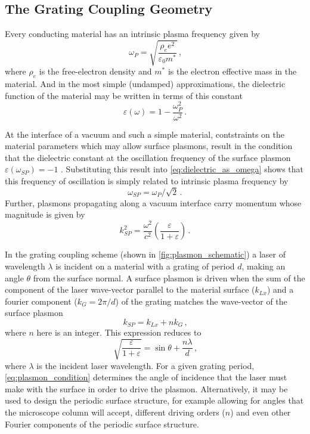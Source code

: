 \subsection{The Grating Coupling Geometry}

Every conducting material has an intrinsic plasma frequency given by 
\begin{equation}
  \omega_{P} = \sqrt{\frac{\rho_{e} e^2}{\varepsilon_{0} m^*}} \,\text{,}
\end{equation}
where $\rho_{e}$ is the free-electron density and $m^*$ is the electron effective mass in the material.
And in the most simple (undamped) approximations, the dielectric function of the material may be written in terms of this constant
\begin{equation} \label{eq:dielectric_as_omega}
  \varepsilon(\omega) = 1 - \frac{ \omega_{P}^2 }{ \omega^2 } \,\text{.}
\end{equation}

At the interface of a vacuum and such a simple material, contstraints on the material parameters which may allow surface plasmons, result in the condition that the dielectric constant at the oscillation frequency of the surface plasmon $ \varepsilon(\omega_{SP}) = -1 $ \cite{cottam_introduction_2004}.
Substituting this result into \ref{eq:dielectric_as_omega} shows that this frequency of oscillation is simply related to intrinsic plasma frequency by
\begin{equation}
  \omega_{SP} = \omega_{P} / \sqrt{2} \,\text{.}
\end{equation}
Further, plasmons propagating along a vacuum interface carry momentum whose magnitude is given by 
\begin{equation}
  k_{SP}^2 = \frac{\omega^2}{c^2} \left( \frac{ \varepsilon }{ 1 + \varepsilon } \right) \,\text{.}
\end{equation}

In the grating coupling scheme (shown in \ref{fig:plasmon_schematic}) a laser of wavelength $\lambda$ is incident on a material with a grating of period $d$, making an angle $\theta$ from the surface normal.
A surface plasmon is driven when the sum of the component of the laser wave-vector parallel to the material surface ($k_{Lx}$) and a fourier component ($k_{G} = 2 \pi / d$) of the grating matches the wave-vector of the surface plasmon
\begin{equation}
  k_{SP} = k_{Lx} + n k_{G} \,\text{,}
\end{equation}
where $n$ here is an integer.
This expression reduces to 
\begin{equation} \label{eq:plasmon_condition}
  \sqrt{ \frac{ \varepsilon }{ 1 + \varepsilon } } = \sin \theta + \frac{ n \lambda }{ d } \,\text{,}
\end{equation}
where $\lambda$ is the incident laser wavelength.
For a given grating period, \ref{eq:plasmon_condition} determines the angle of incidence that the laser must make with the surface in order to drive the plasmon.
Alternatively, it may be used to design the periodic surface structure, for example allowing for angles that the microscope column will accept, different driving orders ($n$) and even other Fourier components of the periodic surface structure.

